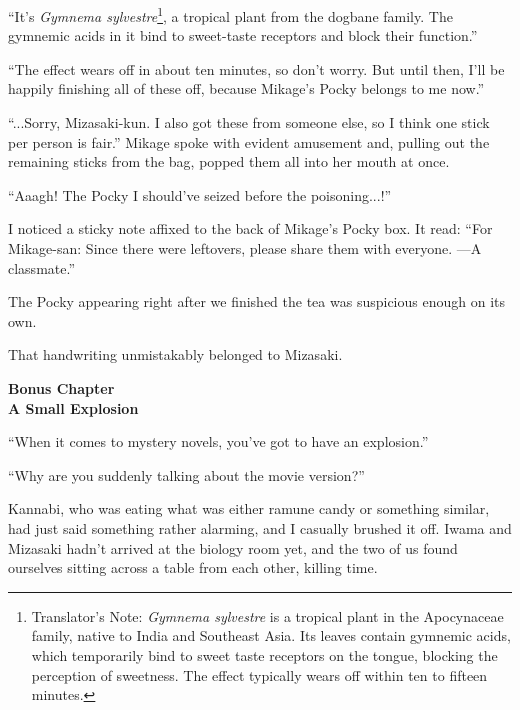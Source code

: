 \documentclass[
    a4paper,
    12pt,
    twoside,
    openany,
    UTF8,
    fontset=windows
]{ctexbook}
\begin{document}
``It's \textit{Gymnema sylvestre}\footnote{Translator's Note: \textit{Gymnema sylvestre} is a tropical plant in the Apocynaceae family, native to India and Southeast Asia. Its leaves contain gymnemic acids, which temporarily bind to sweet taste receptors on the tongue, blocking the perception of sweetness. The effect typically wears off within ten to fifteen minutes.}, a tropical plant from the dogbane family. The gymnemic acids in it bind to sweet-taste receptors and block their function.''

``The effect wears off in about ten minutes, so don't worry. But until then, I'll be happily finishing all of these off, because Mikage's Pocky belongs to me now.''

``...Sorry, Mizasaki-kun. I also got these from someone else, so I think one stick per person is fair.''
Mikage spoke with evident amusement and, pulling out the remaining sticks from the bag, popped them all into her mouth at once.

``Aaagh! The Pocky I should've seized before the poisoning...!''

I noticed a sticky note affixed to the back of Mikage's Pocky box. It read: ``For Mikage-san: Since there were leftovers, please share them with everyone. —A classmate.''

The Pocky appearing right after we finished the tea was suspicious enough on its own.

That handwriting unmistakably belonged to Mizasaki.

\clearpage
\thispagestyle{plain}
\begin{center}
    \large\bfseries
    Bonus Chapter\\
    A Small Explosion
\end{center}
\label{sec:b}
\vspace{1cm}

``When it comes to mystery novels, you've got to have an explosion.''

``Why are you suddenly talking about the movie version?''

Kannabi, who was eating what was either ramune candy or something similar, had just said something rather alarming, and I casually brushed it off. Iwama and Mizasaki hadn't arrived at the biology room yet, and the two of us found ourselves sitting across a table from each other, killing time.
\end{document}
